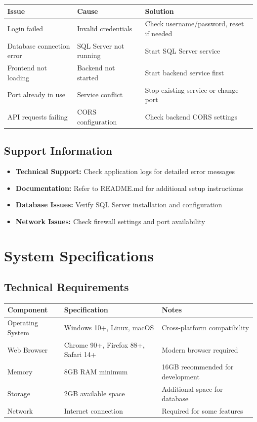 \documentclass[12pt,a4paper]{article}
\begin{document}
\begin{longtable}{@{}|p{4cm}|p{5cm}|p{5cm}|@{}}
\hline
\textbf{Issue} & \textbf{Cause} & \textbf{Solution} \\
\hline
Login failed & Invalid credentials & Check username/password, reset if needed \\
\hline
Database connection error & SQL Server not running & Start SQL Server service \\
\hline
Frontend not loading & Backend not started & Start backend service first \\
\hline
Port already in use & Service conflict & Stop existing service or change port \\
\hline
API requests failing & CORS configuration & Check backend CORS settings \\
\hline
\end{longtable}

\subsection{Support Information}

\begin{itemize}
    \item \textbf{Technical Support:} Check application logs for detailed error messages
    \item \textbf{Documentation:} Refer to README.md for additional setup instructions
    \item \textbf{Database Issues:} Verify SQL Server installation and configuration
    \item \textbf{Network Issues:} Check firewall settings and port availability
\end{itemize}

\section{System Specifications}

\subsection{Technical Requirements}

\begin{longtable}{@{}|p{3cm}|p{4cm}|p{7cm}|@{}}
\hline
\textbf{Component} & \textbf{Specification} & \textbf{Notes} \\
\hline
Operating System & Windows 10+, Linux, macOS & Cross-platform compatibility \\
\hline
Web Browser & Chrome 90+, Firefox 88+, Safari 14+ & Modern browser required \\
\hline
Memory & 8GB RAM minimum & 16GB recommended for development \\
\hline
Storage & 2GB available space & Additional space for database \\
\hline
Network & Internet connection & Required for some features \\
\hline
\end{longtable}
\end{document}

